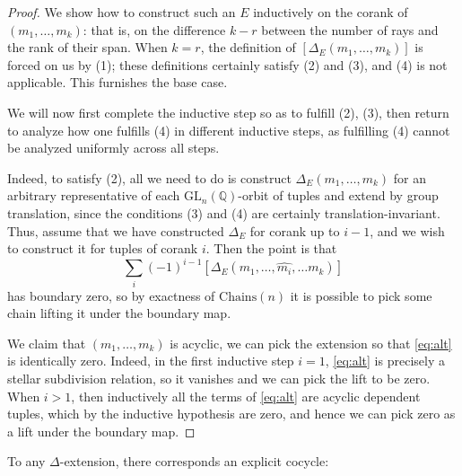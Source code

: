 \documentclass[10pt]{amsart}
\theoremstyle{definition}
\newcommand{\Chains}{\mathrm{Chains}}
\numberwithin{equation}{section}
\begin{document}
    \begin{proof}
        We show how to construct such an $E$ inductively on the corank of $(m_1,\ldots, m_k)$: that is, on the difference $k-r$ between the number of rays and the rank of their span. When $k=r$, the definition of $[\Delta_E(m_1,\ldots, m_k)]$ is forced on us by (1); these definitions certainly satisfy (2) and (3), and (4) is not applicable. This furnishes the base case. 

        We will now first complete the inductive step so as to fulfill (2), (3), then return to analyze how one fulfills (4) in different inductive steps, as fulfilling (4) cannot be analyzed uniformly across all steps.

        Indeed, to satisfy (2), all we need to do is construct $\Delta_E(m_1,\ldots, m_k)$ for an arbitrary representative of each $\mathrm{GL}_n(\mathbb{Q})$-orbit of tuples and extend by group translation, since the conditions (3) and (4) are certainly translation-invariant. Thus, assume that we have constructed $\Delta_E$ for corank up to $i-1$, and we wish to construct it for tuples of corank $i$. Then the point is that 
        \begin{equation} \label{eq:alt}
        \sum_i (-1)^{i-1} [\Delta_E(m_1,\ldots,\hat{m_i},\ldots m_k)]
        \end{equation}
        has boundary zero, so by exactness of $\Chains(n)$ it is possible to pick some chain lifting it under the boundary map.
        
        We claim that $(m_1,\ldots, m_k)$ is acyclic, we can pick the extension so that \eqref{eq:alt} is identically zero. Indeed, in the first inductive step $i=1$, \eqref{eq:alt} is precisely a stellar subdivision relation, so it vanishes and we can pick the lift to be zero. When $i>1$, then inductively all the terms of \eqref{eq:alt} are acyclic dependent tuples, which by the inductive hypothesis are zero, and hence we can pick zero as a lift under the boundary map.
    \end{proof}

    To any $\Delta$-extension, there corresponds an explicit cocycle:
\end{document}
